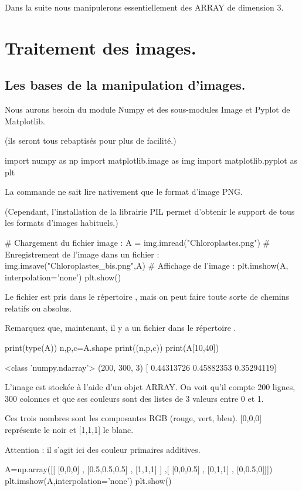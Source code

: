 \documentclass[french,11pt,twoside]{VcCours}
\begin{document}
Dans la suite nous manipulerons essentiellement des ARRAY de dimension $3$.

\section{Traitement des images.}
\subsection{Les bases de la manipulation d'images.}
Nous aurons besoin du module Numpy et des sous-modules Image et Pyplot de Matplotlib. 

(ils seront tous rebaptisés pour plus de facilité.)
\begin{PY}
import numpy as np
import matplotlib.image as img
import matplotlib.pyplot as plt
\end{PY}

La commande  ne sait lire nativement que le format d'image PNG.

(Cependant, l'installation de la librairie PIL permet d'obtenir le support de tous les formats d'images habituels.)
\begin{PY}
# Chargement du fichier image :
A = img.imread("Chloroplastes.png")
# Enregistrement de l'image dans un fichier :
img.imsave("Chloroplastes_bis.png",A)
# Affichage de l'image :
plt.imshow(A, interpolation='none')
plt.show()
\end{PY}

Le fichier est pris dans le répertoire , mais on peut faire toute sorte de chemins relatifs ou absolus.

Remarquez que, maintenant, il y a un fichier  dans le répertoire .

\begin{PY}
print(type(A))
n,p,c=A.shape
print((n,p,c))
print(A[10,40])
\end{PY}
\begin{PYout}
<class 'numpy.ndarray'>
(200, 300, 3)
[ 0.44313726  0.45882353  0.35294119]
\end{PYout}

L'image est stockée à l'aide d'un objet ARRAY. On voit qu'il compte 200 lignes, 300 colonnes et que ses couleurs sont des listes de 3 valeurs entre 0 et 1.

Ces trois nombres sont les composantes RGB (rouge, vert, bleu). [0,0,0] représente le noir et [1,1,1] le blanc.

Attention : il s'agit ici des couleur primaires additives.
\begin{PY}
A=np.array([[ [0,0,0] , [0.5,0.5,0.5] , [1,1,1] ]
           ,[ [0,0,0.5] , [0,1,1] , [0,0.5,0]]])
​
plt.imshow(A,interpolation='none')
plt.show()
\end{PY}
\end{document}
